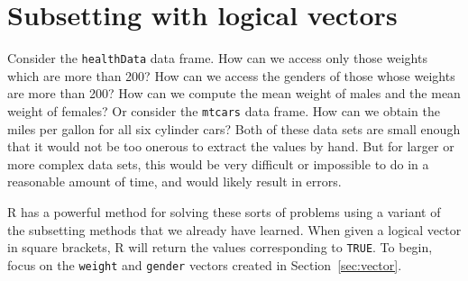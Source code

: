 \documentclass[12pt,oneside]{book}\usepackage[]{graphicx}\usepackage[]{color}
\begin{document}
\section{Subsetting with logical vectors}\label{SEC:SUBSETTING}
Consider the \verb+healthData+ data frame. How can we access only those weights which are more than 200? How can we access the genders of those whose weights are more than 200? How can we compute the mean weight of males and the mean weight of females? Or consider the \verb+mtcars+ data frame. How can we obtain the miles per gallon for all six cylinder cars? Both of these data sets are small enough that it would not be too onerous to extract the values by hand. But for larger or more complex data sets, this would be very difficult or impossible to do in a reasonable amount of time, and would likely result in errors. 

R has a powerful method for solving these sorts of problems using a variant of the subsetting methods that we already have learned. When given a logical vector in square brackets, R will return the values corresponding to \verb+TRUE+. 
To begin, focus on the \verb+weight+ and \verb+gender+ vectors created in Section~\ref{sec:vector}. 
\end{document}
